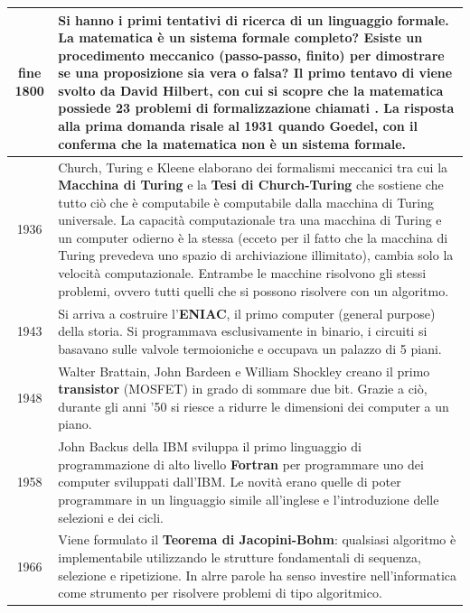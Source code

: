 \documentclass{article}
\begin{document}
\begin{center}
	\begin{tabularx}{\textwidth}{c X}
		fine 1800
		& Si hanno i primi tentativi di \textbf{ricerca di un linguaggio formale}. La matematica è un sistema formale
		completo? Esiste un procedimento meccanico (passo-passo, finito) per dimostrare se una proposizione sia vera
		o falsa? Il primo tentavo di \textit{\say{formalizzazione della matematica}} viene svolto da David Hilbert, con
		cui si scopre che la matematica possiede 23 problemi di formalizzazione chiamati \textit{\say{23 problemi di Hilbert}}.
		La risposta alla prima domanda risale al 1931 quando Goedel, con il \textit{\say{teorema di incompletezza}}
		conferma che la matematica non è un sistema formale. \\
		\midrule
		
		1936
		& Church, Turing e Kleene elaborano dei formalismi meccanici tra cui la \textbf{Macchina di Turing} e la
		\textbf{Tesi di Church-Turing} che sostiene che tutto ciò che è computabile è computabile dalla macchina di
		Turing universale. La capacità computazionale tra una macchina di Turing e un computer odierno è la stessa
		(ecceto per il fatto che la macchina di Turing prevedeva uno spazio di archiviazione illimitato), cambia
		solo la velocità computazionale. Entrambe le macchine risolvono gli stessi problemi, ovvero tutti quelli
		che si possono risolvere con un algoritmo. \\
		\midrule
		
		1943
		& Si arriva a costruire l'\textbf{ENIAC}, il primo computer (general purpose) della storia. Si programmava
		esclusivamente in binario, i circuiti si basavano sulle valvole termoioniche e occupava un palazzo di 5 piani. \\
		\midrule
		
		1948
		& Walter Brattain, John Bardeen e William Shockley creano il primo \textbf{transistor} (MOSFET) in grado di
		sommare due bit. Grazie a ciò, durante gli anni '50 si riesce a ridurre le dimensioni dei computer a un piano. \\
		\midrule
		
		1958
		& John Backus della IBM sviluppa il primo linguaggio di programmazione di alto livello \textbf{Fortran} per
		programmare uno dei computer sviluppati dall'IBM. Le novità erano quelle di poter programmare in un linguaggio
		simile all'inglese e l'introduzione delle selezioni e dei cicli. \\
		\midrule

		1966
		& Viene formulato il \textbf{Teorema di Jacopini-Bohm}: qualsiasi algoritmo è implementabile utilizzando le
		strutture fondamentali di sequenza, selezione e ripetizione. In alrre parole ha senso investire nell'informatica 
		come strumento per risolvere problemi di tipo algoritmico. \\
		\midrule
		

\end{tabularx}
\end{center}
\end{document}
